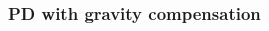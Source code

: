 \begin{frame}
\frametitle{PD with gravity compensation}
%
\begin{columns}
	\begin{column}{0.5\textwidth}
	\begin{figure}
	\end{figure}
	\end{column}
	\begin{column}{0.5\textwidth}
	\begin{figure}
	\end{figure}
	\end{column}
\end{columns}
\end{frame}
